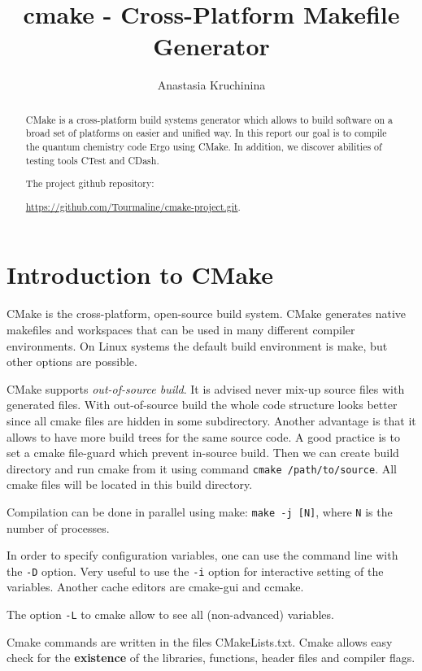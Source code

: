 \documentclass[a4paper,10pt]{article}
\title{cmake - Cross-Platform Makefile Generator}
\author{Anastasia Kruchinina}
\begin{document}
\maketitle
\tableofcontents

\begin{abstract}
CMake is a cross-platform build systems generator which allows to build software on a broad set of platforms on easier and unified way. In this report our goal is to compile the quantum chemistry code Ergo using CMake. In addition, we discover abilities of testing tools CTest and CDash.

\vskip 10pt

The project github repository: 

\url{https://github.com/Tourmaline/cmake-project.git}.

\end{abstract}

\section{Introduction to CMake}

CMake is the cross-platform, open-source build system. CMake generates native makefiles and workspaces that can be used in many different compiler environments. On Linux systems the default build environment is make, but other options are possible.

CMake supports \textit{out-of-source build}. It is advised never mix-up source files with generated files. With out-of-source build the whole code structure looks better since all cmake files are hidden in some subdirectory. Another advantage is that it allows to have more build trees for the same source code.
A good practice is to set a cmake file-guard which prevent in-source build. Then we can create build directory and run cmake from it using command \texttt{cmake /path/to/source}.
All cmake files will be located in this build directory.

Compilation can be done in parallel using make: \texttt{make -j [N]}, where \texttt{N} is the number of processes.

In order to specify configuration variables, one can use the command line with the \texttt{-D} option. Very useful to use the \texttt{-i} option for interactive setting of the variables. Another cache editors are cmake-gui and ccmake.

The option \texttt{-L} to cmake allow to see all (non-advanced) variables.

Cmake commands are written in the files CMakeLists.txt.
Cmake allows easy check for the \textbf{existence} of the libraries, functions, header files and compiler flags.
\end{document}
